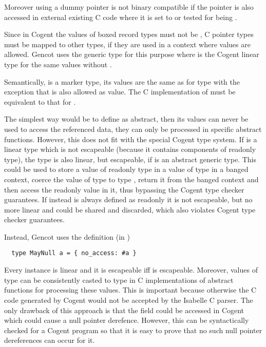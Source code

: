 Moreover using a dummy pointer is not binary compatible if the pointer is also accessed in external existing C code where 
it is set to  or tested for being .

Since in Cogent the values of boxed record types must not be , C pointer types must be mapped to other types, if 
they are used in a context where  values are allowed. Gencot uses the generic type  for this purpose
where  is the Cogent linear type for the same values without .

Semantically,  is a marker type, its values are the same as for type  with the exception that 
 is also allowed as value. The C implementation of  must be equivalent to that for .

The simplest way would be to define  as abstract, then its values can never be used to access the referenced
data, they can only be processed in specific abstract functions. However, this does not fit with the special Cogent type system.
If  is a linear type which is not escapeable (because it contains components of readonly type), the type 
is also linear, but escapeable, if  is an abstract generic type. This could be used to store a value of readonly
type in a value of type  in a banged context, coerce the value of type  to type , return it from
the banged context and then access the readonly value in it, thus bypassing the Cogent type checker guarantees. If 
instead is always defined as readonly it is not escapeable, but no more linear and could be shared and discarded, which also
violates Cogent type checker guarantees. 

Instead, Gencot uses the definition (in )
\begin{verbatim}
  type MayNull a = { no_access: #a }
\end{verbatim}
Every instance  is linear and it is escapeable iff  is escapeable. Moreover, values of type 
can be consistently casted to type  in C implementations of abstract functions for processing these values. This is 
important because otherwise the C code generated by Cogent would not be accepted by the Isabelle C parser. The only
drawback of this approach is that the field  could be accessed in Cogent which could cause a null pointer
derefence. However, this can be syntactically checked for a Cogent program so that it is easy to prove that no such null
pointer dereferences can occur for it.

